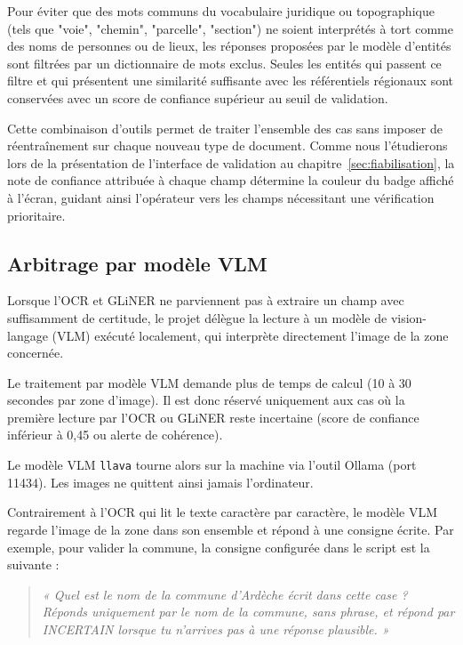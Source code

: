 Pour éviter que des mots communs du vocabulaire juridique ou topographique (tels que "voie", "chemin", "parcelle", "section") ne soient interprétés à tort comme des noms de personnes ou de lieux, les réponses proposées par le modèle d'entités sont filtrées par un dictionnaire de mots exclus. Seules les entités qui passent ce filtre et qui présentent une similarité suffisante avec les référentiels régionaux sont conservées avec un score de confiance supérieur au seuil de validation.

Cette combinaison d'outils permet de traiter l'ensemble des cas sans imposer de réentraînement sur chaque nouveau type de document. Comme nous l'étudierons lors de la présentation de l'interface de validation au chapitre~\ref{sec:fiabilisation}, la note de confiance attribuée à chaque champ détermine la couleur du badge affiché à l'écran, guidant ainsi l'opérateur vers les champs nécessitant une vérification prioritaire.



\subsection{Arbitrage par modèle VLM}

Lorsque l'OCR et GLiNER ne parviennent pas à extraire un champ avec suffisamment de certitude, le projet délègue la lecture à un modèle de vision-langage (VLM) exécuté localement, qui interprète directement l'image de la zone concernée.

Le traitement par modèle VLM demande plus de temps de calcul (10 à 30 secondes par zone d'image). Il est donc réservé uniquement aux cas où la première lecture par l'OCR ou GLiNER reste incertaine (score de confiance inférieur à 0,45 ou alerte de cohérence).

Le modèle VLM  \texttt{llava} tourne alors sur la machine via l'outil Ollama (port 11434). Les images ne quittent ainsi jamais l'ordinateur.

Contrairement à l'OCR qui lit le texte caractère par caractère, le modèle VLM regarde l'image de la zone dans son ensemble et répond à une consigne écrite. Par exemple, pour valider la commune, la consigne configurée dans le script est la suivante :

\begin{quote}
\textit{« Quel est le nom de la commune d'Ardèche écrit dans cette case ? Réponds uniquement par le nom de la commune, sans phrase, et répond par INCERTAIN lorsque tu n'arrives pas à une réponse plausible. »}
\end{quote}

